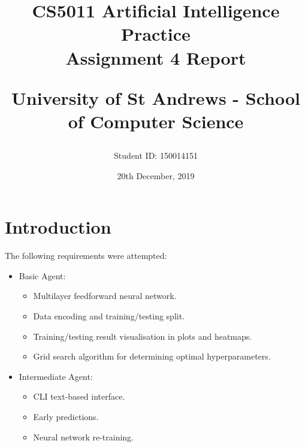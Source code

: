 \documentclass[letterpaper,12pt]{article}
\begin{document}
\title{
    CS5011 Artificial Intelligence Practice\\Assignment 4 Report\\
    \begin{large}
    University of St Andrews - School of Computer Science
    \end{large}
}
\author{Student ID: 150014151}
\date{20th December, 2019}
\maketitle
\newpage

\tableofcontents
\newpage



\section{Introduction}
\label{sec:introduction}

The following requirements were attempted:
\begin{itemize}
    \item Basic Agent:
    \begin{itemize}
        \item Multilayer feedforward neural network.
        \item Data encoding and training/testing split.
        \item Training/testing result visualisation in plots and heatmaps.
        \item Grid search algorithm for determining optimal hyperparameters.
    \end{itemize}
    \item Intermediate Agent:
    \begin{itemize}
        \item CLI text-based interface.
        \item Early predictions.
        \item Neural network re-training.
    \end{itemize}
        
\end{itemize}
\end{document}
